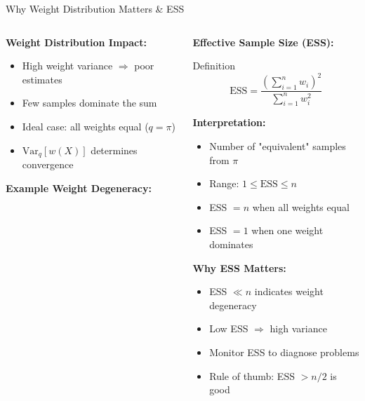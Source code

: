 \documentclass[aspectratio=169]{beamer}
\begin{document}
\begin{frame}{Why Weight Distribution Matters \& ESS}
\begin{columns}
\begin{column}{0.5\textwidth}
\textbf{Weight Distribution Impact:}
\begin{itemize}
\item High weight variance $\Rightarrow$ poor estimates
\item Few samples dominate the sum
\item Ideal case: all weights equal ($q = \pi$)
\item $\text{Var}_q[w(X)]$ determines convergence
\end{itemize}

\vspace{0.3cm}
\textbf{Example Weight Degeneracy:}
\begin{center}
\end{center}
\end{column}

\begin{column}{0.5\textwidth}
\textbf{Effective Sample Size (ESS):}
\begin{block}{Definition}
$$\text{ESS} = \frac{(\sum_{i=1}^n w_i)^2}{\sum_{i=1}^n w_i^2}$$
\end{block}

\textbf{Interpretation:}
\begin{itemize}
\item Number of "equivalent" samples from $\pi$
\item Range: $1 \leq \text{ESS} \leq n$
\item ESS $= n$ when all weights equal
\item ESS $= 1$ when one weight dominates
\end{itemize}

\textbf{Why ESS Matters:}
\begin{itemize}
\item ESS $\ll n$ indicates weight degeneracy
\item Low ESS $\Rightarrow$ high variance
\item Monitor ESS to diagnose problems
\item Rule of thumb: ESS $> n/2$ is good
\end{itemize}
\end{column}
\end{columns}
\end{frame}
\end{document}
